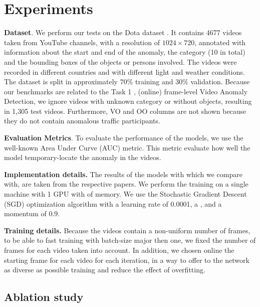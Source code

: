 \section{Experiments}
\label{sec:experiments}

\noindent\textbf{Dataset}.
We perform our tests on the Dota dataset \cite{9712446}.
It contains 4677 videos taken from YouTube channels, with a resolution of $1024 \times 720$, annotated with information about the start and end of the anomaly, the category (10 in total) and the bounding boxes of the objects or persons involved.
The videos were recorded in different countries and with different light and weather conditions.
The dataset is split in approximately $70\%$ training and $30\%$ validation.
Because our benchmarks are related to the Task 1 \cite{9712446}, (online) frame-level Video Anomaly Detection, we ignore videos with unknown category or without objects, resulting in 1,305 test videos.
Furthermore, VO and OO columns are not shown because they do not contain anomalous traffic participants.

\noindent\textbf{Evaluation Metrics}.
To evaluate the performance of the models, we use the well-known Area Under Curve (AUC) metric.
This metric evaluate how well the model temporary-locate the anomaly in the videos.

\noindent\textbf{Implementation details.}
The results of the models with which we compare with, are taken from the respective papers.
We perform the training on a single machine with 1  GPU with  of memory.
We use the Stochastic Gradient Descent (SGD) optimization algorithm with a learning rate of 0.0001, a , and a momentum of 0.9.

\noindent\textbf{Training details.}
Because the videos contain a non-uniform number of frames, to be able to fast training with batch-size major then one, we fixed the number of frames for each video taken into account.
In addition, we chosen online the starting frame for each video for each iteration, in a way to offer to the network as diverse as possible training and reduce the effect of overfitting.

\subsection{Ablation study}


